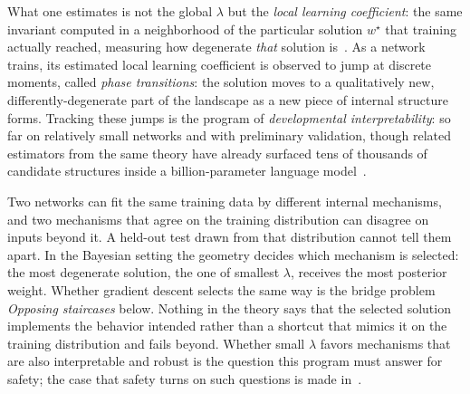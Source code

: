 What one estimates is not the global $\lambda$ but the \emph{local learning coefficient}: the same invariant computed in a neighborhood of the particular solution $w^\star$ that training actually reached, measuring how degenerate \emph{that} solution is~\cite{lau2023}. As a network trains, its estimated local learning coefficient is observed to jump at discrete moments, called \emph{phase transitions}: the solution moves to a qualitatively new, differently-degenerate part of the landscape as a new piece of internal structure forms. Tracking these jumps is the program of \emph{developmental interpretability}: so far on relatively small networks and with preliminary validation, though related estimators from the same theory have already surfaced tens of thousands of candidate structures inside a billion-parameter language model~\cite{murfet2026}.

Two networks can fit the same training data by different internal mechanisms, and two mechanisms that agree on the training distribution can disagree on inputs beyond it. A held-out test drawn from that distribution cannot tell them apart. In the Bayesian setting the geometry decides which mechanism is selected: the most degenerate solution, the one of smallest $\lambda$, receives the most posterior weight. Whether gradient descent selects the same way is the bridge problem \emph{Opposing staircases} below. Nothing in the theory says that the selected solution implements the behavior intended rather than a shortcut that mimics it on the training distribution and fails beyond. Whether small $\lambda$ favors mechanisms that are also interpretable and robust is the question this program must answer for safety; the case that safety turns on such questions is made in~\cite{lehalleur2025}.

